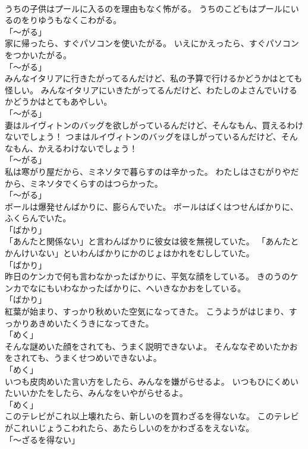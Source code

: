 \documentclass[8pt]{extreport}
\begin{document}
\begin{CJK}{UTF8}{min}
\\	うちの子供はプールに入るのを理由もなく怖がる。	うちのこどもはプールにいるのをりゆうもなくこわがる。	
\\	「～がる」	
\\	家に帰ったら、すぐパソコンを使いたがる。	いえにかえったら、すぐパソコンをつかいたがる。	
\\	「～がる」	
\\	みんなイタリアに行きたがってるんだけど、私の予算で行けるかどうかはとても怪しい。	みんなイタリアにいきたがってるんだけど、わたしのよさんでいけるかどうかはとてもあやしい。	
\\	「～がる」	
\\	妻はルイヴィトンのバッグを欲しがっているんだけど、そんなもん、買えるわけないでしょう！	つまはルイヴィトンのバッグをほしがっているんだけど、そんなもん、かえるわけないでしょう！	
\\	「～がる」	
\\	私は寒がり屋だから、ミネソタで暮らすのは辛かった。	わたしはさむがりやだから、ミネソタでくらすのはつらかった。	
\\	「～がる」	
\\	ボールは爆発せんばかりに、膨らんでいた。	ボールはばくはつせんばかりに、ふくらんでいた。	
\\	「ばかり」 
\\	「あんたと関係ない」と言わんばかりに彼女は彼を無視していた。	「あんたとかんけいない」といわんばかりにかのじょはかれをむししていた。	
\\	「ばかり」 
\\	昨日のケンカで何も言わなかったばかりに、平気な顔をしている。	きのうのケンカでなにもいわなかったばかりに、へいきなかおをしている。	
\\	「ばかり」 
\\	紅葉が始まり、すっかり秋めいた空気になってきた。	こうようがはじまり、すっかりあきめいたくうきになってきた。	
\\	「めく」 
\\	そんな謎めいた顔をされても、うまく説明できないよ。	そんななぞめいたかおをされても、うまくせつめいできないよ。	
\\	「めく」 
\\	いつも皮肉めいた言い方をしたら、みんなを嫌がらせるよ。	いつもひにくめいたいいかたをしたら、みんなをいやがらせるよ。	
\\	「めく」 
\\	このテレビがこれ以上壊れたら、新しいのを買わざるを得ないな。	このテレビがこれいじょうこわれたら、あたらしいのをかわざるをえないな。	
\\	「～ざるを得ない」	

\end{CJK}
\end{document}
